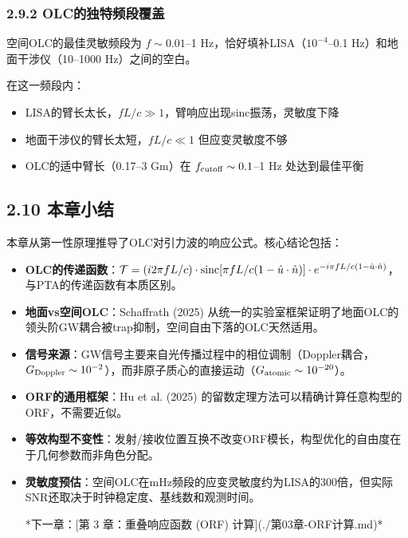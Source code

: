 \documentclass[12pt,a4paper]{article}
\begin{document}
\subsubsection{2.9.2 OLC的独特频段覆盖}


空间OLC的最佳灵敏频段为 $f \sim 0.01$–1 Hz，恰好填补LISA（$10^{-4}$–0.1 Hz）和地面干涉仪（10–1000 Hz）之间的空白。

在这一频段内：
\begin{itemize}
  \item LISA的臂长太长，$fL/c \gg 1$，臂响应出现sinc振荡，灵敏度下降
  \item 地面干涉仪的臂长太短，$fL/c \ll 1$ 但应变灵敏度不够
  \item OLC的适中臂长（0.17–3 Gm）在 $f_{\rm cutoff} \sim 0.1$–1 Hz 处达到最佳平衡

\end{itemize}
\subsection{2.10 本章小结}


本章从第一性原理推导了OLC对引力波的响应公式。核心结论包括：

\begin{itemize}
  \item[1] \textbf{OLC的传递函数}：$\mathcal{T} = (i2\pi fL/c) \cdot {\rm sinc}[\pi fL/c(1-\hat{u}\cdot\hat{n})] \cdot e^{-i\pi fL/c(1-\hat{u}\cdot\hat{n})}$，与PTA的传递函数有本质区别。

  \item[2] \textbf{地面vs空间OLC}：Schaffrath (2025) 从统一的实验室框架证明了地面OLC的领头阶GW耦合被trap抑制，空间自由下落的OLC天然适用。

  \item[3] \textbf{信号来源}：GW信号主要来自光传播过程中的相位调制（Doppler耦合，$G_{\rm Doppler} \sim 10^{-2}$），而非原子质心的直接运动（$G_{\rm atomic} \sim 10^{-20}$）。

  \item[4] \textbf{ORF的通用框架}：Hu et al. (2025) 的留数定理方法可以精确计算任意构型的ORF，不需要近似。

  \item[5] \textbf{等效构型不变性}：发射/接收位置互换不改变ORF模长，构型优化的自由度在于几何参数而非角色分配。

  \item[6] \textbf{灵敏度预估}：空间OLC在mHz频段的应变灵敏度约为LISA的300倍，但实际SNR还取决于时钟稳定度、基线数和观测时间。


*下一章：[第 3 章：重叠响应函数 (ORF) 计算](./第03章-ORF计算.md)*

\end{itemize}
\end{document}
